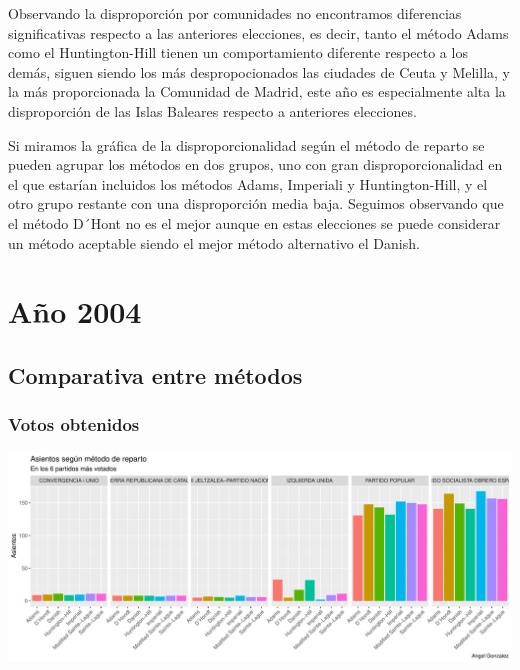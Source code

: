 \documentclass[12pt,a4paper,]{book}
\numberwithin{dummy}{section}
\theoremstyle{ocrenumbox}
\theoremstyle{blacknumex}
\theoremstyle{blacknumbox}
\theoremstyle{ocrenum}
\theoremstyle{ocrenum}
\begin{document}
Observando la disproporción por comunidades no encontramos diferencias
significativas respecto a las anteriores elecciones, es decir, tanto el
método Adams como el Huntington-Hill tienen un comportamiento diferente
respecto a los demás, siguen siendo los más despropocionados las
ciudades de Ceuta y Melilla, y la más proporcionada la Comunidad de
Madrid, este año es especialmente alta la disproporción de las Islas
Baleares respecto a anteriores elecciones.

Si miramos la gráfica de la disproporcionalidad según el método de
reparto se pueden agrupar los métodos en dos grupos, uno con gran
disproporcionalidad en el que estarían incluidos los métodos Adams,
Imperiali y Huntington-Hill, y el otro grupo restante con una
disproporción media baja. Seguimos observando que el método D´Hont no es
el mejor aunque en estas elecciones se puede considerar un método
aceptable siendo el mejor método alternativo el Danish.

\hypertarget{auxf1o-2004}{%
\section{Año 2004}\label{auxf1o-2004}}

\hypertarget{comparativa-entre-muxe9todos-8}{%
\subsection{Comparativa entre
métodos}\label{comparativa-entre-muxe9todos-8}}

\hypertarget{votos-obtenidos-8}{%
\subsubsection{Votos obtenidos}\label{votos-obtenidos-8}}

\begin{center}\includegraphics[width=0.95\linewidth]{figurasR/unnamed-chunk-131-1} \end{center}
\end{document}

